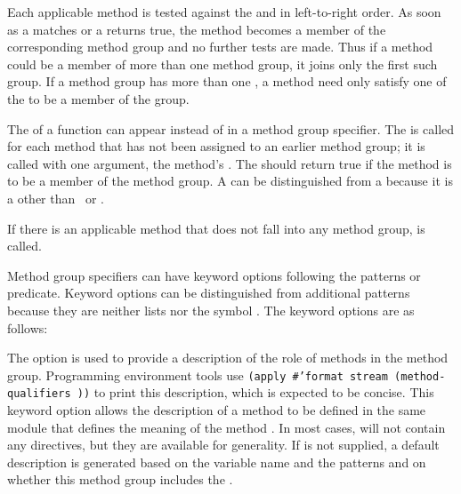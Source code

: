  
Each applicable method is tested against the  and
 in left-to-right order.  
As soon as a  matches
or a  returns true, the method becomes a member of the
corresponding method group and no further tests are made.  Thus if a method
could be a member of more than one method group, it joins only the first
such group.  If a method group has more than one 
, a
method need only satisfy one of the  to be a member of
the group.
 
The  of a  function can appear instead of 
 in a method group specifier.  
The  is called for
each method that has not been assigned to an earlier method group; it
is called with one argument, the method's  .
The  should return true if the method is to be a member of the
method group.  A  can be distinguished from a 
because it is a  other than \nil\ or \misc{*}.
 
 
If there is an applicable method that does not fall into any method group,
 is called.
 
Method group specifiers can have keyword options following the
 patterns or predicate.  Keyword options can be distinguished from
additional  patterns because they are neither lists nor the symbol
\misc{*}.  The keyword options are as follows:
 
\beginlist
 
\itemitem{\bull}
The  option is used to provide a description of the
role of methods in the method group.  Programming environment tools
use
 {\tt (apply \#'format stream  (method-qualifiers ))}
to print this description, which
is expected to be concise.  This keyword
option allows the description of a method  to be defined in
the same module that defines the meaning of the 
method .  In most cases,  will not contain any
 directives, but they are available for generality.  
If  is not supplied, a default description is generated
based on the variable name and the  patterns and on whether
this method group includes the .  
 
